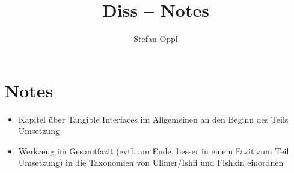 \documentclass[a4paper,10pt]{article}
\title{Diss -- Notes}
\author{Stefan Oppl}
\begin{document}
\maketitle

\section{Notes}

\begin{itemize}
 \item Kapitel über Tangible Interfaces im Allgemeinen an den Beginn des Teils Umsetzung
 \item Werkzeug im Gesamtfazit (evtl. am Ende, besser in einem Fazit zum Teil Umsetzung) in die Taxonomien von Ullmer/Ishii und Fishkin einordnen
\end{itemize}
\end{document}
